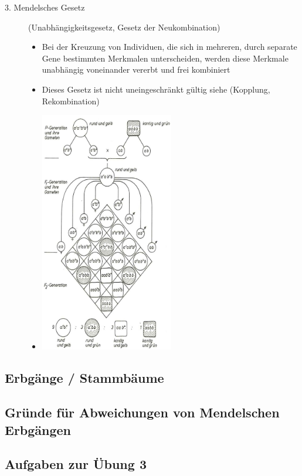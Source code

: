 \begin{description}
\begin{itemize}
        \end{itemize}
    \item[3. Mendelsches Gesetz] (Unabhängigkeitsgesetz, Gesetz der Neukombination)
        \begin{itemize}
            \item Bei der Kreuzung von Individuen, die sich in mehreren, durch separate Gene bestimmten Merkmalen unterscheiden, werden diese Merkmale unabhängig voneinander vererbt und frei kombiniert
            \item Dieses Gesetz ist nicht uneingeschränkt gültig siehe (Kopplung, Rekombination)
            \item[] \includegraphics[width=0.5\textwidth]{lectures/V3/pix/Mendel3.jpg}
        \end{itemize}
\end{description}

\subsection{Erbgänge / Stammbäume}

\subsection{Gründe für Abweichungen von Mendelschen Erbgängen}

\subsection{Aufgaben zur Übung 3}

